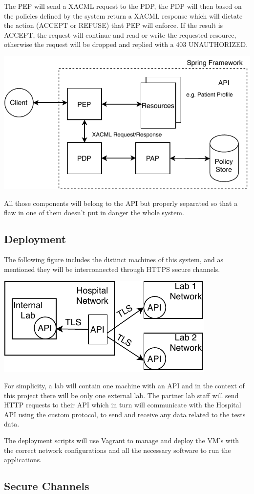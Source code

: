 The PEP will send a XACML\cite{xacml} request to the PDP, the PDP will then based on the policies defined by the system return a XACML response which will dictate the action (ACCEPT or REFUSE) that PEP will enforce. If the result is ACCEPT, the request will continue and read or write the requested resource, otherwise the request will be dropped and replied with a 403 UNAUTHORIZED.

	\includegraphics[width=.6\textwidth]{figs/access_control.pdf}


All those components will belong to the API but properly separated so that a flaw in one of them doesn't put in danger the whole system.

\subsection{Deployment}
The following figure includes the distinct machines of this system, and as mentioned they will be interconnected through HTTPS secure channels.

	\includegraphics[width=.4\textwidth]{figs/infrastructure.pdf}

For simplicity, a lab will contain one machine with an API and in the context of this project there will be only one external lab. The partner lab staff will send HTTP requests to their API which in turn will communicate with the Hospital API using the custom protocol, to send and receive any data related to the tests data.

The deployment scripts will use Vagrant\cite{vagrant} to manage and deploy the VM's with the correct network configurations and all the necessary software to run the applications. \\

\subsection{Secure Channels}


